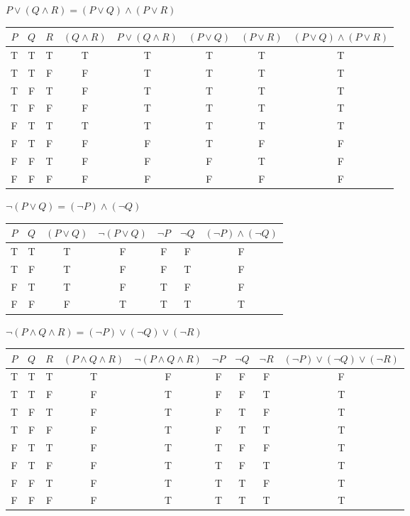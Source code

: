 \documentclass[DIN, pagenumber=false, fontsize=11pt, parskip=half]{scrartcl}
\begin{document}
\begin{problems}
    \problem $P \lor (Q \land R) = (P \lor Q) \land (P \lor R)$
    \answer
    \begin{center}
        \begin{tabular}{cccccccc}
            $P$ & $Q$ & $R$ & $(Q \land R)$ & $P \lor (Q \land R)$ & $(P \lor Q)$ & $(P \lor R)$ & $(P \lor Q) \land (P \lor R)$\\
            \midrule
            T & T & T & T & T & T & T & T\\ 
            T & T & F & F & T & T & T & T\\ 
            T & F & T & F & T & T & T & T\\ 
            T & F & F & F & T & T & T & T\\ 
            F & T & T & T & T & T & T & T\\ 
            F & T & F & F & F & T & F & F\\
            F & F & T & F & F & F & T & F\\ 
            F & F & F & F & F & F & F & F
        \end{tabular}
    \end{center}

    \problem $\lnot (P \lor Q) = (\lnot P) \land (\lnot Q)$
    \answer
    \begin{center}
        \begin{tabular}{ccccccc}
            $P$ & $Q$ & $(P \lor Q)$ & $\lnot (P \lor Q)$ & $\lnot P$ & $\lnot Q$ & $(\lnot P) \land (\lnot Q)$\\
            \midrule
            T & T & T & F & F & F & F\\
            T & F & T & F & F & T & F\\ 
            F & T & T & F & T & F & F\\ 
            F & F & F & T & T & T & T
        \end{tabular}
    \end{center}

    \problem $\lnot (P \land Q \land R) = (\lnot P) \lor (\lnot Q) \lor (\lnot R)$
    \answer
    \begin{center}
        \begin{tabular}{ccccccccc}
            $P$ & $Q$ & $R$ & $(P \land Q \land R)$ & $\lnot (P \land Q \land R)$ & $\lnot P$ & $\lnot Q$ & $\lnot R$ & $(\lnot P) \lor (\lnot Q) \lor (\lnot R)$\\
            \midrule
            T & T & T & T & F & F & F & F & F\\
            T & T & F & F & T & F & F & T & T\\
            T & F & T & F & T & F & T & F & T\\
            T & F & F & F & T & F & T & T & T\\
            F & T & T & F & T & T & F & F & T\\
            F & T & F & F & T & T & F & T & T\\
            F & F & T & F & T & T & T & F & T\\
            F & F & F & F & T & T & T & T & T
        \end{tabular}
    \end{center}


\end{problems}
\end{document}
